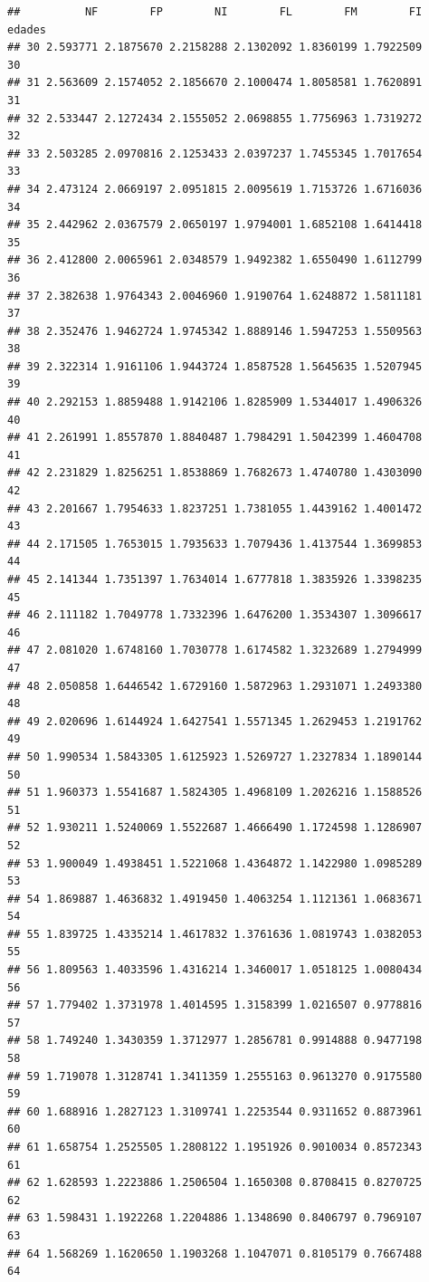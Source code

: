\documentclass[
]{article}
\begin{document}
\begin{verbatim}
##          NF        FP        NI        FL        FM        FI edades
## 30 2.593771 2.1875670 2.2158288 2.1302092 1.8360199 1.7922509     30
## 31 2.563609 2.1574052 2.1856670 2.1000474 1.8058581 1.7620891     31
## 32 2.533447 2.1272434 2.1555052 2.0698855 1.7756963 1.7319272     32
## 33 2.503285 2.0970816 2.1253433 2.0397237 1.7455345 1.7017654     33
## 34 2.473124 2.0669197 2.0951815 2.0095619 1.7153726 1.6716036     34
## 35 2.442962 2.0367579 2.0650197 1.9794001 1.6852108 1.6414418     35
## 36 2.412800 2.0065961 2.0348579 1.9492382 1.6550490 1.6112799     36
## 37 2.382638 1.9764343 2.0046960 1.9190764 1.6248872 1.5811181     37
## 38 2.352476 1.9462724 1.9745342 1.8889146 1.5947253 1.5509563     38
## 39 2.322314 1.9161106 1.9443724 1.8587528 1.5645635 1.5207945     39
## 40 2.292153 1.8859488 1.9142106 1.8285909 1.5344017 1.4906326     40
## 41 2.261991 1.8557870 1.8840487 1.7984291 1.5042399 1.4604708     41
## 42 2.231829 1.8256251 1.8538869 1.7682673 1.4740780 1.4303090     42
## 43 2.201667 1.7954633 1.8237251 1.7381055 1.4439162 1.4001472     43
## 44 2.171505 1.7653015 1.7935633 1.7079436 1.4137544 1.3699853     44
## 45 2.141344 1.7351397 1.7634014 1.6777818 1.3835926 1.3398235     45
## 46 2.111182 1.7049778 1.7332396 1.6476200 1.3534307 1.3096617     46
## 47 2.081020 1.6748160 1.7030778 1.6174582 1.3232689 1.2794999     47
## 48 2.050858 1.6446542 1.6729160 1.5872963 1.2931071 1.2493380     48
## 49 2.020696 1.6144924 1.6427541 1.5571345 1.2629453 1.2191762     49
## 50 1.990534 1.5843305 1.6125923 1.5269727 1.2327834 1.1890144     50
## 51 1.960373 1.5541687 1.5824305 1.4968109 1.2026216 1.1588526     51
## 52 1.930211 1.5240069 1.5522687 1.4666490 1.1724598 1.1286907     52
## 53 1.900049 1.4938451 1.5221068 1.4364872 1.1422980 1.0985289     53
## 54 1.869887 1.4636832 1.4919450 1.4063254 1.1121361 1.0683671     54
## 55 1.839725 1.4335214 1.4617832 1.3761636 1.0819743 1.0382053     55
## 56 1.809563 1.4033596 1.4316214 1.3460017 1.0518125 1.0080434     56
## 57 1.779402 1.3731978 1.4014595 1.3158399 1.0216507 0.9778816     57
## 58 1.749240 1.3430359 1.3712977 1.2856781 0.9914888 0.9477198     58
## 59 1.719078 1.3128741 1.3411359 1.2555163 0.9613270 0.9175580     59
## 60 1.688916 1.2827123 1.3109741 1.2253544 0.9311652 0.8873961     60
## 61 1.658754 1.2525505 1.2808122 1.1951926 0.9010034 0.8572343     61
## 62 1.628593 1.2223886 1.2506504 1.1650308 0.8708415 0.8270725     62
## 63 1.598431 1.1922268 1.2204886 1.1348690 0.8406797 0.7969107     63
## 64 1.568269 1.1620650 1.1903268 1.1047071 0.8105179 0.7667488     64

\end{verbatim}
\end{document}
